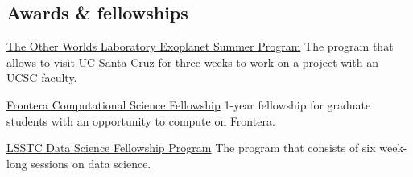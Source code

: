 \documentclass[10pt]{article} %
\begin{document}
\begin{paracol}{1}



\section{Awards \& fellowships}





	
	{\href{https://owl.ucsc.edu/summer/}{The Other Worlds Laboratory Exoplanet Summer Program}} %
	{The program that allows to visit UC Santa Cruz for three weeks to work on a project with an UCSC faculty.} %

	{\href{https://frontera-portal.tacc.utexas.edu/fellowship/}{Frontera Computational Science Fellowship}} %
	{1-year fellowship for graduate students with an opportunity to compute on Frontera.} %

	{\href{https://www.lsstcorporation.org/fellowship_program}{LSSTC Data Science Fellowship Program}} %
	{The program that consists of six week-long sessions on data science.} %
	

\end{paracol}
\end{document}
